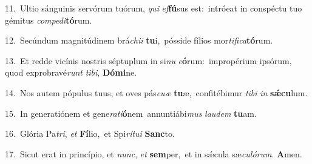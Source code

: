 {\numbfont\textcolor{\numbcolor}{11.}}~Ultio sánguinis servórum tuórum, \textit{qui} \textit{ef}\-\textbf{fú}sus est:~\star intróeat in conspéctu tuo gémitus \textit{com}\-\textit{pe}\textit{di}\textbf{tó}rum.\par
{\numbfont\textcolor{\numbcolor}{12.}}~Secúndum magnitúdinem brá\-\textit{chi}\-\textit{i} \textbf{tu}\-i,~\star pósside fílios mor\-\textit{ti}\-\textit{fi}\textit{ca}\textbf{tó}rum.\par
{\numbfont\textcolor{\numbcolor}{13.}}~Et redde vicínis nostris séptuplum in si\textit{nu} \textit{e}\-\textbf{ó}rum:~\star impropérium ipsórum, quod exprobravé\textit{runt} \textit{ti}\-\textit{bi}, \textbf{Dó}\-\textbf{mi}ne.\par
{\numbfont\textcolor{\numbcolor}{14.}}~Nos autem pópulus tuus, et oves pás\-\textit{cu}\-\textit{æ} \textbf{tu}\-æ,~\star confitébimur \textit{ti}\-\textit{bi} \textit{in} \textbf{sǽ}\-\textbf{cu}lum.\par
{\numbfont\textcolor{\numbcolor}{15.}}~In generatiónem et gene\-\textit{ra}\-\textit{ti}\textbf{ó}nem~\star annuntiábi\textit{mus} \textit{lau}\-\textit{dem} \textbf{tu}\-am.\par
{\numbfont\textcolor{\numbcolor}{16.}}~Glória Pa\-\textit{tri}\-, \textit{et} \textbf{Fí}\-lio,~\star et Spi\-\textit{rí}\-\textit{tu}\textit{i} \textbf{Sanc}\-to.\par
{\numbfont\textcolor{\numbcolor}{17.}}~Sicut erat in princípio, et \textit{nunc}\-, \textit{et} \textbf{sem}\-per,~\star et in sǽcula sæ\-\textit{cu}\-\textit{ló}\textit{rum}. \textbf{A}\-men.\par
